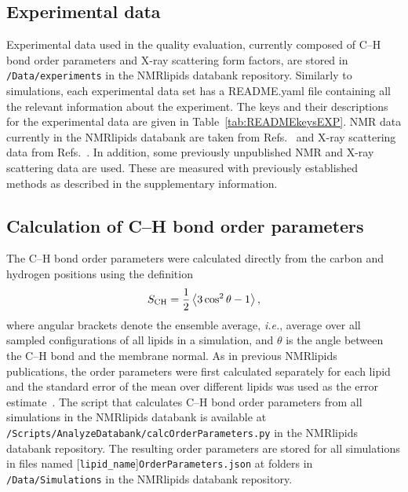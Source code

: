 \documentclass[fleqn,10pt]{wlscirep}
\begin{document}
\subsection{Experimental data}
Experimental data used in the quality evaluation, currently composed of C--H bond order parameters and X-ray scattering form factors, are stored in \texttt{/Data/experiments} in the NMRlipids databank repository. Similarly to simulations, each experimental data set has a README.yaml file containing all the relevant information about the experiment. The keys and their descriptions for the experimental data are given in Table~\ref{tab:READMEkeysEXP}. NMR data currently in the NMRlipids databank are taken from Refs.~ and X-ray scattering data from Refs.~. In addition, some previously unpublished NMR and X-ray scattering data are used. These are measured with previously established methods as described in the supplementary information. 


\subsection{Calculation of C--H bond order parameters}
The C--H bond order parameters were calculated directly from the carbon and hydrogen positions using the definition
\begin{equation}\label{OP}
S_{\rm CH}=\frac{1}{2}\left\langle 3\cos^2\theta -1 \right\rangle,
\end{equation}
where angular brackets denote the ensemble average, \textit{i.e.}, average over all sampled configurations of all lipids in a simulation, and $\theta$ is the angle between the C--H bond and the membrane normal. As in previous NMRlipids publications, the order parameters were first calculated separately for each lipid and the standard error of the mean over different lipids was used as the error estimate~\cite{botan15}. The script that calculates C--H bond order parameters from all simulations in the NMRlipids databank is available at \texttt{/Scripts/AnalyzeDatabank/calcOrderParameters.py} in the NMRlipids databank repository. The resulting order parameters are stored for all simulations in files named %
[\texttt{lipid\_name}]\texttt{OrderParameters.json} at folders in \texttt{/Data/Simulations} in the NMRlipids databank repository.
\end{document}
